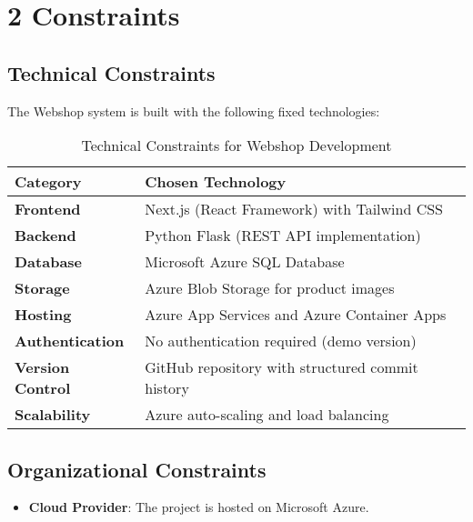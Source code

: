 \hypertarget{constraints}{%
\section{2 Constraints}\label{section-constraints}}

\subsection{Technical Constraints}
The Webshop system is built with the following fixed technologies:

\begin{table}[h]
\centering
\begin{tabular}{|l|l|}
\hline
\textbf{Category} & \textbf{Chosen Technology} \\ \hline
\textbf{Frontend} & Next.js (React Framework) with Tailwind CSS \\ \hline
\textbf{Backend} & Python Flask (REST API implementation) \\ \hline
\textbf{Database} & Microsoft Azure SQL Database \\ \hline
\textbf{Storage} & Azure Blob Storage for product images \\ \hline
\textbf{Hosting} & Azure App Services and Azure Container Apps \\ \hline
\textbf{Authentication} & No authentication required (demo version) \\ \hline
\textbf{Version Control} & GitHub repository with structured commit history \\ \hline
\textbf{Scalability} & Azure auto-scaling and load balancing \\ \hline
\end{tabular}
\caption{Technical Constraints for Webshop Development}
\label{tab:constraints}
\end{table}

\subsection{Organizational Constraints}
\begin{itemize}
    \item \textbf{Cloud Provider}: The project is hosted on Microsoft Azure.
\end{itemize}

